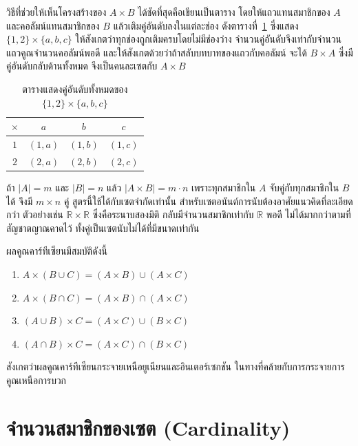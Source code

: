 วิธีที่ช่วยให้เห็นโครงสร้างของ $A \times B$ ได้ชัดที่สุดคือเขียนเป็นตาราง โดยให้แถวแทนสมาชิกของ $A$ และคอลัมน์แทนสมาชิกของ $B$ แล้วเติมคู่อันดับลงในแต่ละช่อง ดังตารางที่~\ref{tab:cartesian-grid} ซึ่งแสดง $\{1,2\} \times \{a,b,c\}$ ให้สังเกตว่าทุกช่องถูกเติมครบโดยไม่มีช่องว่าง จำนวนคู่อันดับจึงเท่ากับจำนวนแถวคูณจำนวนคอลัมน์พอดี และให้สังเกตด้วยว่าถ้าสลับบทบาทของแถวกับคอลัมน์ จะได้ $B \times A$ ซึ่งมีคู่อันดับกลับด้านทั้งหมด จึงเป็นคนละเซตกับ $A \times B$

\begin{table}[H]
\centering
\caption{ตารางแสดงคู่อันดับทั้งหมดของ $\{1,2\} \times \{a,b,c\}$}
\label{tab:cartesian-grid}
\renewcommand{\arraystretch}{1.3}
\begin{tabular}{|c|c|c|c|}
\hline
$\times$ & $a$ & $b$ & $c$ \\
\hline
$1$ & $(1,a)$ & $(1,b)$ & $(1,c)$ \\
$2$ & $(2,a)$ & $(2,b)$ & $(2,c)$ \\
\hline
\end{tabular}
\end{table}

\begin{rem}
ถ้า $|A| = m$ และ $|B| = n$ แล้ว $|A \times B| = m \cdot n$ เพราะทุกสมาชิกใน $A$ จับคู่กับทุกสมาชิกใน $B$ ได้ จึงมี $m \times n$ คู่ สูตรนี้ใช้ได้กับเซตจำกัดเท่านั้น สำหรับเซตอนันต์การนับต้องอาศัยแนวคิดที่ละเอียดกว่า ตัวอย่างเช่น $\mathbb{R} \times \mathbb{R}$ ซึ่งคือระนาบสองมิติ กลับมีจำนวนสมาชิกเท่ากับ $\mathbb{R}$ พอดี ไม่ได้มากกว่าตามที่สัญชาตญาณคาดไว้ ทั้งคู่เป็นเซตนับไม่ได้ที่มีขนาดเท่ากัน
\end{rem}

\begin{prop}
ผลคูณคาร์ทีเซียนมีสมบัติดังนี้
\begin{enumerate}
    \item $A \times (B \cup C) = (A \times B) \cup (A \times C)$
    \item $A \times (B \cap C) = (A \times B) \cap (A \times C)$
    \item $(A \cup B) \times C = (A \times C) \cup (B \times C)$
    \item $(A \cap B) \times C = (A \times C) \cap (B \times C)$
\end{enumerate}
สังเกตว่าผลคูณคาร์ทีเซียนกระจายเหนือยูเนียนและอินเตอร์เซกชัน ในทางที่คล้ายกับการกระจายการคูณเหนือการบวก
\end{prop}

\section{จำนวนสมาชิกของเซต (Cardinality)}
\label{sec:cardinality}

